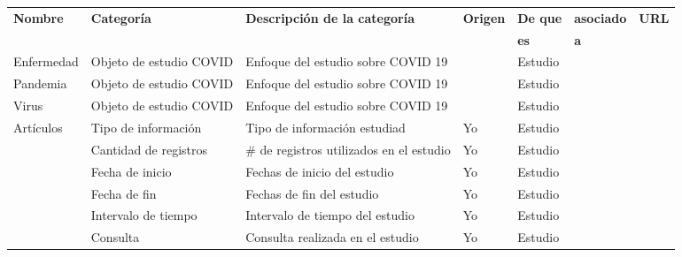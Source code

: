 \begin{longtable}{|p{2cm}|p{2cm}|p{2cm}|p{1.2cm}|p{1.9cm}|p{1.5cm}|p{2.1cm}|}
\hline
\textbf{Nombre}   & \textbf{Categoría}         & \textbf{Descripción de la categoría}     & \textbf{Origen}& \textbf{De que}  & \textbf{asociado}& \textbf{URL}                                        \\
                  & \textbf{}                  & \textbf{}                                & \textbf{     } & \textbf{es}      & \textbf{a}      & \textbf{}                                           \\ \hline
Enfermedad        & Objeto de estudio COVID    & Enfoque del estudio sobre COVID 19       &                & Estudio          &                &                                                     \\ \hline
Pandemia          & Objeto de estudio COVID    & Enfoque del estudio sobre COVID 19       &                & Estudio          &                &                                                     \\ \hline
Virus             & Objeto de estudio COVID    & Enfoque del estudio sobre COVID 19       &                & Estudio          &                &                                                     \\ \hline
Artículos         & Tipo de información        & Tipo de información estudiad             & Yo             & Estudio          &                &                                                     \\ \hline
                  & Cantidad de registros      & \# de registros utilizados en el estudio & Yo             & Estudio          &                &                                                     \\ \hline
                  & Fecha de inicio            & Fechas de inicio del estudio             & Yo             & Estudio          &                &                                                     \\ \hline
                  & Fecha de fin               & Fechas de fin del estudio                & Yo             & Estudio          &                &                                                     \\ \hline
                  & Intervalo de tiempo        & Intervalo de tiempo del estudio          & Yo             & Estudio          &                &                                                     \\ \hline
                  & Consulta                   & Consulta realizada en el estudio         & Yo             & Estudio          &                &                                                     \\ \hline

\end{longtable}
